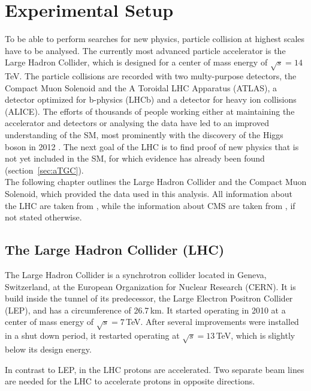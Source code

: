\chapter{Experimental Setup}
\label{chap::ExperimentalSetup}
To be able to perform searches for new physics, particle collision at highest scales have to be analysed. The currently most advanced particle accelerator is the Large Hadron Collider, which is designed for a center of mass energy of $\sqrt{s}= 14$\,TeV. The particle collisions are recorded with two multy-purpose detectors, the Compact Muon Solenoid and the A Toroidal LHC Apparatus (ATLAS), a detector optimized for b-physics (LHCb) and a detector for heavy ion collisions (ALICE). The efforts of thousands of people working either at maintaining the accelerator and detectors or analysing the data have led to an improved understanding of the SM, most prominently with the discovery of the Higgs boson in 2012 \cite{cms_higgsdiscov,atlas_higgsdiscov}. The next goal of the LHC is to find proof of new physics that is not yet included in the SM, for which evidence has already been found (section~\ref{sec:aTGC}).\\

\noindent The following chapter outlines the Large Hadron Collider and the Compact Muon Solenoid, which provided the data used in this analysis. All information about the LHC are taken from \cite{lhc_machine}, while the information about CMS are taken from \cite{CMS}, if not stated otherwise.
\section{The Large Hadron Collider (LHC)}
The Large Hadron Collider is a synchrotron collider located in Geneva, Switzerland, at the European Organization for Nuclear Research (CERN). It is build inside the tunnel of its predecessor, the Large Electron Positron Collider (LEP), and has a circumference of 26.7\,km. It started operating in 2010 at a center of mass energy of $\sqrt{s}=7$\,TeV. After several improvements were installed in a shut down period, it restarted operating at $\sqrt{s}=13$\,TeV, which is slightly below its design energy.


In contrast to LEP, in the LHC protons are accelerated. Two separate beam lines are needed for the LHC to accelerate protons in opposite directions.




